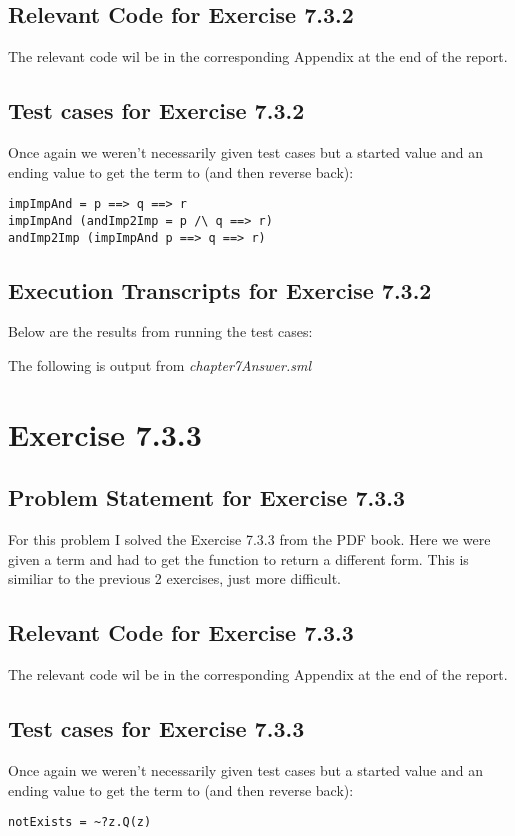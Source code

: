 \documentclass{report}
\begin{document}
\section{Relevant Code for Exercise 7.3.2}
\label{sec:relevant-code-ex-7-3-2}
  The relevant code wil be in the corresponding Appendix at the
  end of the report.

\section{Test cases for Exercise 7.3.2}
\label{sec:tests-ex-7-3-2}
Once again we weren't necessarily given test cases but a started value
and an ending value to get the term to (and then reverse back):
\begin{lstlisting}[frame=TBlr]
impImpAnd = p ==> q ==> r
impImpAnd (andImp2Imp = p /\ q ==> r)
andImp2Imp (impImpAnd p ==> q ==> r)
\end{lstlisting}

\section{Execution Transcripts for Exercise 7.3.2}
\label{sec:exe-ex-7-3-2}
Below are the results from running the test cases:

The following is output from \emph{chapter7Answer.sml}


\chapter{Exercise 7.3.3}
\label{cha:exercise-7-3-3}

\section{Problem Statement for Exercise 7.3.3}
\label{sec:problem-statement-ex-7-3-3}
For this problem I solved the Exercise 7.3.3 from the PDF book. Here
we were given a term and had to get the function to return a different
form. This is similiar to the previous 2 exercises, just more
difficult.

\section{Relevant Code for Exercise 7.3.3}
\label{sec:relevant-code-ex-7-3-3}
  The relevant code wil be in the corresponding Appendix at the
  end of the report.

\section{Test cases for Exercise 7.3.3}
\label{sec:tests-ex-7-3-3}
Once again we weren't necessarily given test cases but a started value
and an ending value to get the term to (and then reverse back):
\begin{lstlisting}[frame=TBlr]
notExists = ~?z.Q(z)
\end{lstlisting}
\end{document}

